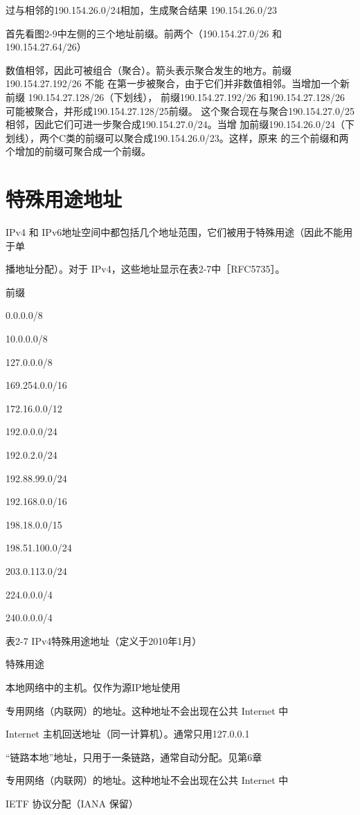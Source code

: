 过与相邻的190.154.26.0/24相加，生成聚合结果 190.154.26.0/23

首先看图2-9中左侧的三个地址前缀。前两个（190.154.27.0/26 和 190.154.27.64/26）

数值相邻，因此可被组合（聚合）。箭头表示聚合发生的地方。前缀190.154.27.192/26 不能
在第一步被聚合，由于它们并非数值相邻。当增加一个新前缀 190.154.27.128/26（下划线），
前缀190.154.27.192/26 和190.154.27.128/26 可能被聚合，并形成190.154.27.128/25前缀。
这个聚合现在与聚合190.154.27.0/25相邻，因此它们可进一步聚合成190.154.27.0/24。当增
加前缀190.154.26.0/24（下划线），两个C类的前缀可以聚合成190.154.26.0/23。这样，原来
的三个前缀和两个增加的前缀可聚合成一个前缀。

\section{特殊用途地址}
IPv4 和 IPv6地址空间中都包括几个地址范围，它们被用于特殊用途（因此不能用于单

播地址分配）。对于 IPv4，这些地址显示在表2-7中［RFC5735］。

前缀

0.0.0.0/8

10.0.0.0/8

127.0.0.0/8

169.254.0.0/16

172.16.0.0/12

192.0.0.0/24

192.0.2.0/24

192.88.99.0/24

192.168.0.0/16

198.18.0.0/15

198.51.100.0/24

203.0.113.0/24

224.0.0.0/4

240.0.0.0/4

表2-7 IPv4特殊用途地址（定义于2010年1月）

特殊用途

本地网络中的主机。仅作为源IP地址使用

专用网络（内联网）的地址。这种地址不会出现在公共 Internet 中

Internet 主机回送地址（同一计算机）。通常只用127.0.0.1

“链路本地”地址，只用于一条链路，通常自动分配。见第6章

专用网络（内联网）的地址。这种地址不会出现在公共 Internet 中

IETF 协议分配（IANA 保留）

